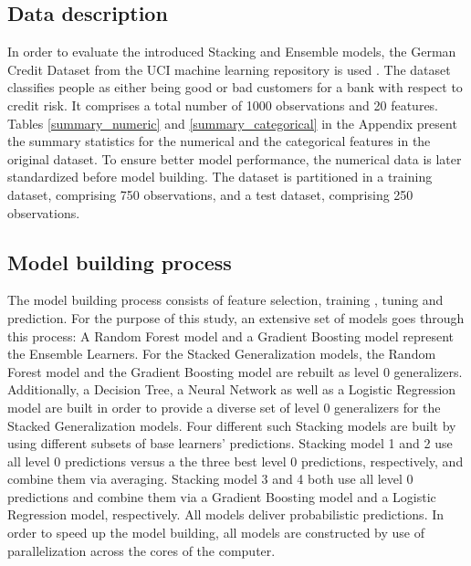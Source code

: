 \documentclass[12pt]{article}
\begin{document}
\subsection{Data description}
In order to evaluate the introduced Stacking and Ensemble models, the German Credit Dataset from the UCI machine learning repository is used \citep{dataset}. The dataset classifies people as either being good or bad customers for a bank with respect to credit risk. It comprises a total number of 1000 observations and 20 features. Tables \ref{summary_numeric} and \ref{summary_categorical} in the Appendix present the summary statistics for the numerical and the categorical features in the original dataset. To ensure better model performance, the numerical data is later standardized before model building. The dataset is partitioned in a training dataset, comprising 750 observations, and a test dataset, comprising 250 observations.





\subsection{Model building process}
The model building process consists of feature selection, training , tuning and prediction. For the purpose of this study, an extensive set
of models goes through this process: A Random Forest model and a Gradient Boosting model represent the Ensemble Learners. For the Stacked Generalization models, the Random Forest model and the Gradient Boosting model are rebuilt as level 0 generalizers. Additionally, a Decision Tree, a Neural Network as well as a Logistic Regression model are built in order to provide a diverse set of level 0 generalizers for the Stacked Generalization models. Four different such Stacking models are built by using different subsets of base learners' predictions. Stacking model 1 and 2 use all level 0 predictions versus a the three best level 0 predictions, respectively, and combine them via averaging. Stacking model 3 and 4 both use all level 0 predictions and combine them via a Gradient Boosting model and a Logistic Regression model, respectively. All models deliver probabilistic predictions. In order to speed up the model building, all models are constructed by use of parallelization across the cores of the computer. 
\end{document}
